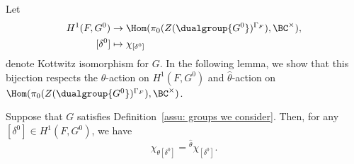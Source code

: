 \documentclass[11pt,letterpaper]{amsart}
\numberwithin{equation}{section}
\begin{document}
Let 
\begin{align*}
    H^1(F,G^0) &\to \Hom(\pi_0(Z(\dualgroup{G^0})^{\Gamma_F}), \BC^{\times }),\\
    [\delta^0]& \mapsto \chi_{[\delta^0]}
\end{align*}
denote Kottwitz isomorphism for $G$. In the following lemma, we show that this bijection respects the $\theta$-action on $H^1(F,G^0)$ and $\hat{\theta}$-action on $ \Hom(\pi_0(Z(\dualgroup{G^0})^{\Gamma_F}), \BC^{\times })$.

\begin{lemma}\label{lemma: Kottwitz isomorphism}
     Suppose that $G$ satisfies Definition~\ref{assu: groups we consider}. Then, for any $[\delta^0] \in H^1(F,G^0)$, we have 
     \[ \chi_{\theta[\delta^0]}= {}^{\hat{\theta}} \chi_{[\delta^0]}.\]
\end{lemma}
\end{document}
